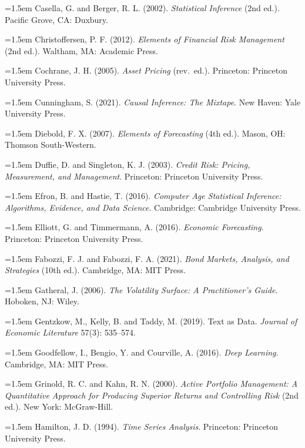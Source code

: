 \hangindent=1.5em Casella, G. and Berger, R. L. (2002). \emph{Statistical Inference} (2nd ed.). Pacific Grove, CA: Duxbury.

\hangindent=1.5em Christoffersen, P. F. (2012). \emph{Elements of Financial Risk Management} (2nd ed.). Waltham, MA: Academic Press.

\hangindent=1.5em Cochrane, J. H. (2005). \emph{Asset Pricing} (rev.\ ed.). Princeton: Princeton University Press.

\hangindent=1.5em Cunningham, S. (2021). \emph{Causal Inference: The Mixtape}. New Haven: Yale University Press.

\hangindent=1.5em Diebold, F. X. (2007). \emph{Elements of Forecasting} (4th ed.). Mason, OH: Thomson South-Western.

\hangindent=1.5em Duffie, D. and Singleton, K. J. (2003). \emph{Credit Risk: Pricing, Measurement, and Management}. Princeton: Princeton University Press.

\hangindent=1.5em Efron, B. and Hastie, T. (2016). \emph{Computer Age Statistical Inference: Algorithms, Evidence, and Data Science}. Cambridge: Cambridge University Press.

\hangindent=1.5em Elliott, G. and Timmermann, A. (2016). \emph{Economic Forecasting}. Princeton: Princeton University Press.

\hangindent=1.5em Fabozzi, F. J. and Fabozzi, F. A. (2021). \emph{Bond Markets, Analysis, and Strategies} (10th ed.). Cambridge, MA: MIT Press.

\hangindent=1.5em Gatheral, J. (2006). \emph{The Volatility Surface: A Practitioner's Guide}. Hoboken, NJ: Wiley.

\hangindent=1.5em Gentzkow, M., Kelly, B. and Taddy, M. (2019). Text as Data. \emph{Journal of Economic Literature} 57(3): 535--574.

\hangindent=1.5em Goodfellow, I., Bengio, Y. and Courville, A. (2016). \emph{Deep Learning}. Cambridge, MA: MIT Press.

\hangindent=1.5em Grinold, R. C. and Kahn, R. N. (2000). \emph{Active Portfolio Management: A Quantitative Approach for Producing Superior Returns and Controlling Risk} (2nd ed.). New York: McGraw-Hill.

\hangindent=1.5em Hamilton, J. D. (1994). \emph{Time Series Analysis}. Princeton: Princeton University Press.

